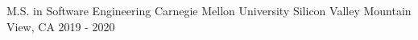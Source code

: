 
\begin{cventries}

  \cventry
    {M.S. in Software Engineering} %
    {Carnegie Mellon University Silicon Valley} %
    {Mountain View, CA} %
    {2019 - 2020} %
    {}
    
    



\vspace{-0.5cm}
\end{cventries}

